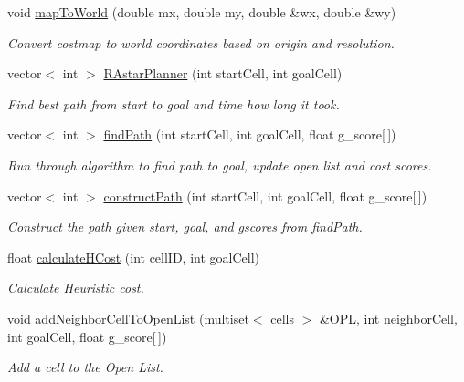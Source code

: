 \begin{DoxyCompactItemize}
void \hyperlink{class_r_astar__planner_1_1_r_astar_planner_r_o_s_a5bb178849971d2425519d247874cfbd9}{map\+To\+World} (double mx, double my, double \&wx, double \&wy)
\begin{DoxyCompactList}\small\item\em Convert costmap to world coordinates based on origin and resolution. \end{DoxyCompactList}\item 
vector$<$ int $>$ \hyperlink{class_r_astar__planner_1_1_r_astar_planner_r_o_s_a4eb4df0ea9159a6bc3ec1f2ee5467e48}{R\+Astar\+Planner} (int start\+Cell, int goal\+Cell)
\begin{DoxyCompactList}\small\item\em Find best path from start to goal and time how long it took. \end{DoxyCompactList}\item 
vector$<$ int $>$ \hyperlink{class_r_astar__planner_1_1_r_astar_planner_r_o_s_a6104dbbc687dced899ca220fa4ca2166}{find\+Path} (int start\+Cell, int goal\+Cell, float g\+\_\+score\mbox{[}$\,$\mbox{]})
\begin{DoxyCompactList}\small\item\em Run through algorithm to find path to goal, update open list and cost scores. \end{DoxyCompactList}\item 
vector$<$ int $>$ \hyperlink{class_r_astar__planner_1_1_r_astar_planner_r_o_s_a9137b395e9984141728feaa096858ef0}{construct\+Path} (int start\+Cell, int goal\+Cell, float g\+\_\+score\mbox{[}$\,$\mbox{]})
\begin{DoxyCompactList}\small\item\em Construct the path given start, goal, and gscores from find\+Path. \end{DoxyCompactList}\item 
float \hyperlink{class_r_astar__planner_1_1_r_astar_planner_r_o_s_a723d289d6debbf185e8a0e8430a0a4d7}{calculate\+H\+Cost} (int cell\+ID, int goal\+Cell)
\begin{DoxyCompactList}\small\item\em Calculate Heuristic cost. \end{DoxyCompactList}\item 
void \hyperlink{class_r_astar__planner_1_1_r_astar_planner_r_o_s_a16d9f8d214db7aa9c42faade56580b83}{add\+Neighbor\+Cell\+To\+Open\+List} (multiset$<$ \hyperlink{structcells}{cells} $>$ \&O\+PL, int neighbor\+Cell, int goal\+Cell, float g\+\_\+score\mbox{[}$\,$\mbox{]})
\begin{DoxyCompactList}\small\item\em Add a cell to the Open List. \end{DoxyCompactList}\item 

\end{DoxyCompactItemize}
